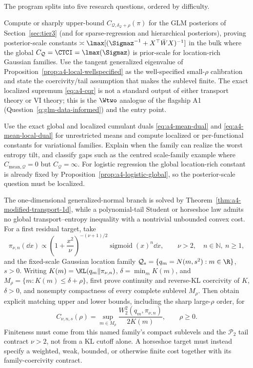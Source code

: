 \documentclass[../../main.tex]{subfiles}
\begin{document}
The program splits into five research questions, ordered by difficulty.

\begin{question}
\label{q:a4-restricted}
Compute or sharply upper-bound $C_{\mathcal Q,\delta_{\mathcal Q}+\rho}(\pi)$ for the GLM
posteriors of Section~\ref{sec:tier3} (and for sparse-regression and hierarchical posteriors),
proving posterior-scale constants $\asymp\lmax[(\Sigmaz^{-1}+X^\top\bar W X)^{-1}]$ in the bulk
where the global $C_{\mathcal Q}=\CTCI=\lmax(\Sigmaz)$ is prior-scale for location-rich Gaussian
families. Use the tangent generalized eigenvalue of
Proposition~\ref{prop:a4-local-wellspecified} as the
well-specified small-$\rho$ calibration and state the coercivity/tail assumption that makes the
sublevel finite. The exact localized supremum
\eqref{eq:a4-cqr} is not a standard output of either transport theory or VI theory; this is the
$\Wtwo$ analogue of the flagship A1 (Question~\ref{q:glm-data-informed}) and the entry point.
\end{question}

\begin{question}
\label{q:a4-mean}
Use the exact global and localized cumulant duals \eqref{eq:a4-mean-dual} and
\eqref{eq:a4-mean-local-dual} for unrestricted means and compute localized
or per-functional constants for variational families. Explain when the family can realize the
worst entropy tilt, and classify gaps such as the centred scale-family example where
$C_{\mathrm{mean},\mathcal Q}=0$ but $C_{\mathcal Q}=\infty$. For logistic regression the global
location-rich constant is already fixed by Proposition~\ref{prop:a4-logistic-global}, so the
posterior-scale question must be localized.
\end{question}

\begin{question}
\label{q:a4-modified}
The one-dimensional generalized-normal branch is solved by
Theorem~\ref{thm:a4-modified-transport-1d}, while a polynomial-tail Student or horseshoe law
admits no global transport--entropy inequality with a nontrivial unbounded convex cost.  For a
first residual target, take
\[
 \pi_{\nu,n}(\dd x)\propto
 \left(1+\frac{x^2}{\nu}\right)^{-(\nu+1)/2}
 \operatorname{sigmoid}(x)^n\dd x,
 \qquad \nu>2,\quad n\in\mathbb N,\ n\ge1,
\]
and the fixed-scale Gaussian location family
$\mathcal Q_s=\{q_m=N(m,s^2):m\in\R\}$, $s>0$.  Writing
$K(m)=\KL(q_m\|\pi_{\nu,n})$, $\delta=\min_mK(m)$, and
$M_\rho=\{m:K(m)\le\delta+\rho\}$, first prove continuity and reverse-KL coercivity of $K$,
$\delta>0$, and nonempty compactness of every complete sublevel $M_\rho$.  Then obtain explicit
matching upper and lower bounds, including
the sharp large-$\rho$ order, for
\[
 C_{\nu,n,s}(\rho)
 =\sup_{m\in M_\rho}
 \frac{W_2^2(q_m,\pi_{\nu,n})}{2K(m)},
 \qquad \rho\ge0.
\]
Finiteness must come from this named family's compact sublevels and the $\mathcal P_2$ tail
contract $\nu>2$, not from a KL cutoff alone.  A horseshoe target must instead specify a
weighted, weak, bounded, or otherwise finite cost together with its family-coercivity contract.
\end{question}
\end{document}
